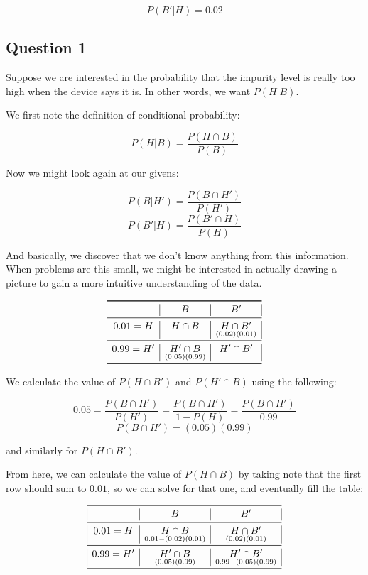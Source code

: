 \documentclass{article}
\begin{document}
\[
P(B'|H)=0.02
\]

\subsection*{Question 1}

Suppose we are interested in the probability that the impurity level
is really too high when the device says it is. In other words, we want
$P(H|B)$.

We first note the definition of conditional probability:

\[
P(H|B)=\dfrac{P(H\cap B)}{P(B)}
\]

Now we might look again at our givens:

\[
P(B|H')=\dfrac{P(B\cap H')}{P(H')}
\] \[
P(B'|H)=\dfrac{P(B'\cap H)}{P(H)}
\]

And basically, we discover that we don't know anything from this
information. When problems are this small, we might be interested in
actually drawing a picture to gain a more intuitive understanding of
the data.

\[
\begin{array}{@{}|c|c|c|@{}}
\toprule
   & B & B' \\
\midrule
0.01 = H  & H\cap B & \underset{(0.02)(0.01)}{H\cap B'} \\
\midrule
0.99 = H' & \underset{(0.05)(0.99)}{H'\cap B} & H'\cap B' \\
\bottomrule
\end{array}
\]

We calculate the value of $P(H\cap{}B')$ and $P(H'\cap{}B)$ using the following:

\[
0.05=\dfrac{P(B\cap H')}{P(H')}=\dfrac{P(B\cap H')}{1-P(H)}=\dfrac{P(B\cap H')}{0.99}
\] \[
P(B\cap H')=(0.05)(0.99)
\]

and similarly for $P(H\cap{}B')$.

From here, we can calculate the value of $P(H\cap{}B)$ by taking note
that the first row should sum to $0.01$, so we can solve for that one,
and eventually fill the table:

\[
\begin{array}{@{}|c|c|c|@{}}
\toprule
   & B & B' \\
\midrule
0.01 = H  & \underset{0.01-(0.02)(0.01)}{H\cap B} & \underset{(0.02)(0.01)}{H\cap B'} \\
\midrule
0.99 = H' & \underset{(0.05)(0.99)}{H'\cap B} & \underset{0.99-(0.05)(0.99)}{H'\cap B'} \\
\bottomrule
\end{array}
\]
\end{document}
